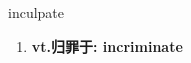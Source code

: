 
\begin{frame}
{\huge inculpate}
\begin{center}
\begin{enumerate}\Large
  \item \textbf{vt.归罪于: incriminate}
\end{enumerate}
\end{center}
\end{frame}
